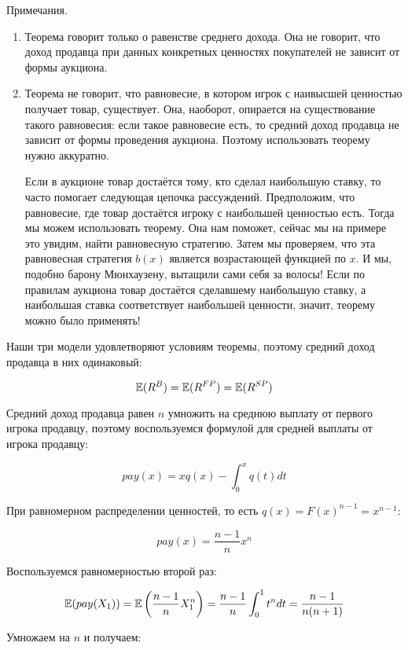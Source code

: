 Примечания.
\begin{enumerate}
\item Теорема говорит только о равенстве среднего дохода. Она не говорит, что доход продавца при данных конкретных ценностях покупателей не зависит от формы аукциона.
\item Теорема не говорит, что равновесие, в котором игрок с наивысшей ценностью получает товар, существует. Она, наоборот, опирается на существование такого равновесия: если такое равновесие есть, то средний доход продавца не зависит от формы проведения аукциона. Поэтому использовать теорему нужно аккуратно.

Если в аукционе товар достаётся тому, кто сделал наибольшую ставку, то часто помогает следующая цепочка рассуждений. Предположим, что равновесие, где товар достаётся игроку с наибольшей ценностью есть. Тогда мы можем использовать теорему. Она нам поможет, сейчас мы на примере это увидим, найти равновесную стратегию. Затем мы проверяем, что эта равновесная стратегия $b(x)$ является возрастающей функцией по $x$. И мы, подобно барону Мюнхаузену, вытащили сами себя за волосы! Если по правилам аукциона товар достаётся сделавшему наибольшую ставку, а наибольшая ставка соответствует наибольшей ценности, значит, теорему можно было применять!
\end{enumerate}


Наши три модели удовлетворяют условиям теоремы, поэтому средний доход продавца в них одинаковый:

\[ \mathbb{E}(R^{B})=\mathbb{E}(R^{FP})=\mathbb{E}(R^{SP}) \]

Средний доход продавца равен $ n $ умножить на среднюю выплату от первого игрока продавцу, поэтому воспользуемся формулой для средней выплаты от игрока продавцу:

\[ pay(x)=xq(x)-\int_{0}^{x}q(t)dt \]

При равномерном распределении ценностей, то есть $ q(x)=F(x)^{n-1}=x^{n-1} $:

\begin{equation}
pay(x)=\frac{n-1}{n}x^{n}
\end{equation}

Воспользуемся равномерностью второй раз:

\begin{equation}
\mathbb{E}(pay(X_{1}))=\mathbb{E}\left(\frac{n-1}{n}X_{1}^{n}\right)=\frac{n-1}{n}\int_{0}^{1} t^{n} dt=\frac{n-1}{n(n+1)}
\end{equation}

Умножаем на $ n $ и получаем:

